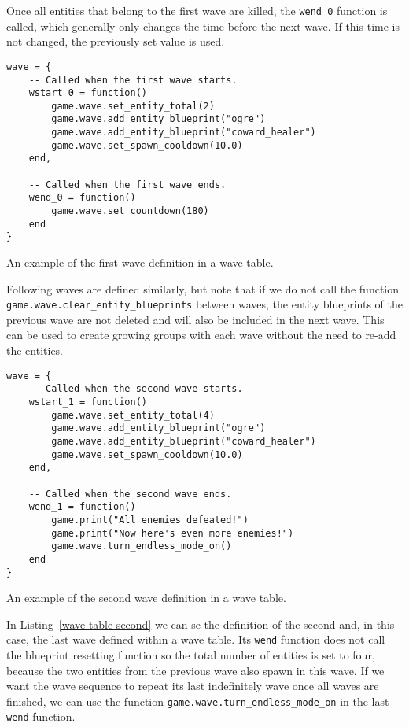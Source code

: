 Once all entities that belong to the first wave are killed, the \texttt{wend\_0} function is called, which generally only changes the
time before the next wave. If this time is not changed, the previously set value is used.

\begin{listing}[H]
    \centering
    \begin{lstlisting}
wave = {
    -- Called when the first wave starts.
    wstart_0 = function()
        game.wave.set_entity_total(2)
        game.wave.add_entity_blueprint("ogre")
        game.wave.add_entity_blueprint("coward_healer")
        game.wave.set_spawn_cooldown(10.0)
    end,

    -- Called when the first wave ends.
    wend_0 = function()
        game.wave.set_countdown(180)
    end
}
    \end{lstlisting}
    \caption{An example of the first wave definition in a wave table.}
    \label{wave-table-first}
\end{listing}

Following waves are defined similarly, but note that if we do not call the function \texttt{game.wave.clear\_entity\_blueprints} between
waves, the entity blueprints of the previous wave are not deleted and will also be included in the next wave. This can be used to create
growing groups with each wave without the need to re-add the entities.

\begin{listing}[H]
    \centering
    \begin{lstlisting}
wave = {
    -- Called when the second wave starts.
    wstart_1 = function()
        game.wave.set_entity_total(4)
        game.wave.add_entity_blueprint("ogre")
        game.wave.add_entity_blueprint("coward_healer")
        game.wave.set_spawn_cooldown(10.0)
    end,

    -- Called when the second wave ends.
    wend_1 = function()
        game.print("All enemies defeated!")
        game.print("Now here's even more enemies!")
        game.wave.turn_endless_mode_on()
    end
}
    \end{lstlisting}
    \caption{An example of the second wave definition in a wave table.}
    \label{wave-table-second}
\end{listing}

In Listing~\ref{wave-table-second} we can se the definition of the second and, in this case, the last wave defined within a wave table.
Its \texttt{wend} function does not call the blueprint resetting function so the total number of entities is set to four, because the two
entities from the previous wave also spawn in this wave.
If we want the wave sequence to repeat its last indefinitely wave once all waves are finished, we can use the function
\texttt{game.wave.turn\_endless\_mode\_on} in the last \texttt{wend} function.

